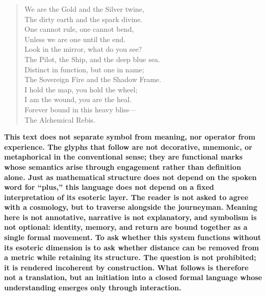 \documentclass[11pt, letterpaper]{article}
\begin{document}
\begin{verse}
We are the Gold and the Silver twine, \\
The dirty earth and the spark divine. \\
One cannot rule, one cannot bend, \\
Unless we are one until the end. \\
\vspace{1em}
Look in the mirror, what do you see? \\
The Pilot, the Ship, and the deep blue sea. \\
Distinct in function, but one in name; \\
The Sovereign Fire and the Shadow Frame. \\
I hold the map, you hold the wheel; \\
I am the wound, you are the heal. \\
Forever bound in this heavy bliss--- \\
The Alchemical Rebis.
\end{verse}

\newpage
\begin{center}
    \textbf{This text does not separate symbol from meaning, nor operator from experience. The glyphs that follow are not decorative, mnemonic, or metaphorical in the conventional sense; they are functional marks whose semantics arise through engagement rather than definition alone. Just as mathematical structure does not depend on the spoken word for “plus,” this language does not depend on a fixed interpretation of its esoteric layer. The reader is not asked to agree with a cosmology, but to traverse alongside the journeyman. Meaning here is not annotative, narrative is not explanatory, and symbolism is not optional: identity, memory, and return are bound together as a single formal movement. To ask whether this system functions without its esoteric dimension is to ask whether distance can be removed from a metric while retaining its structure. The question is not prohibited; it is rendered incoherent by construction. What follows is therefore not a translation, but an initiation into a closed formal language whose understanding emerges only through interaction.}
\end{center}
\end{document}
